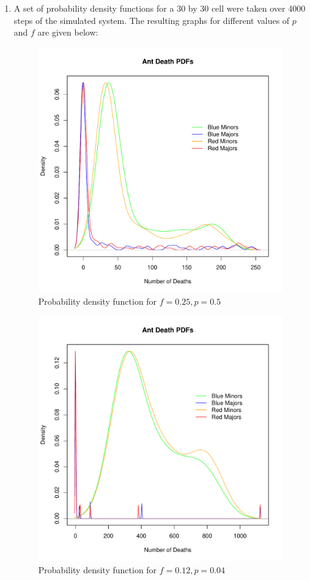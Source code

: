 \begin{enumerate}
\item A set of probability density functions for a 30 by 30 cell were taken 
over 4000 steps of the simulated system.  The resulting graphs for different
values of $p$ and $f$ are given below:

\begin{figure}[h!]
\centering
\includegraphics[scale=0.80]{partb1v1.pdf}
\caption{Probability density function for $f = 0.25, p = 0.5$}
\label{partb1fig}
\end{figure}

\begin{figure}[h!]
\centering
\includegraphics[scale=0.80]{partb2v1.pdf}
\caption{Probability density function for $f = 0.12, p = 0.04$}
\label{partb2fig}
\end{figure}


\end{enumerate}
